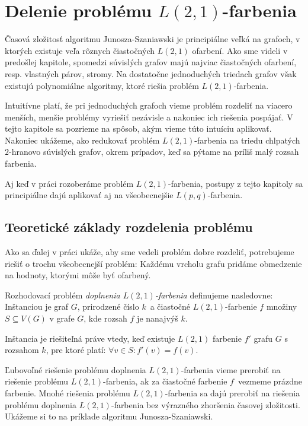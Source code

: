 \chapter{Delenie problému $L(2,1)$-farbenia}

Časová zložitosť algoritmu Junosza-Szaniawski je principiálne veľká na grafoch, v ktorých
existuje veľa rôznych čiastočných $L(2,1)$ ofarbení. Ako sme videli v predošlej kapitole,
spomedzi súvislých grafov majú najviac čiastočných ofarbení, resp. vlastných párov, stromy.
Na dostatočne jednoduchých triedach grafov však existujú polynomiálne algoritmy, ktoré
riešia problém $L(2,1)$-farbenia.

Intuitívne platí, že pri jednoduchých grafoch vieme problém rozdeliť na viacero menších,
menšie problémy vyriešiť nezávisle a nakoniec ich riešenia pospájať. V tejto kapitole
sa pozrieme na spôsob, akým vieme túto intuíciu aplikovať. Nakoniec ukážeme, ako redukovať
problém $L(2,1)$-farbenia na triedu chlpatých $2$-hranovo súvislých grafov, okrem prípadov,
keď sa pýtame na príliš malý rozsah farbenia.

Aj keď v práci rozoberáme problém $L(2,1)$-farbenia, postupy z tejto kapitoly sa principiálne
dajú aplikovať aj na všeobecnejšie $L(p,q)$-farbenia.

\section{Teoretické základy rozdelenia problému}

Ako sa ďalej v práci ukáže, aby sme vedeli problém dobre rozdeliť, potrebujeme riešiť
o trochu všeobecnejší problém: Každému vrcholu grafu pridáme obmedzenie na hodnoty,
ktorými môže byť ofarbený.

\begin{defn}
    Rozhodovací problém \emph{doplnenia $L(2,1)$-farbenia} definujeme nasledovne: Inštanciou je
    graf $G$, prirodzené číslo $k$ a čiastočné $L(2,1)$-farbenie $f$ množiny $S \subseteq V(G)$
    v grafe $G$, kde rozsah $f$ je nanajvýš $k$.

    Inštancia je riešiteľná práve vtedy, keď existuje $L(2,1)$ farbenie
    $f'$ grafu $G$ s rozsahom $k$, pre ktoré platí: $\forall v \in S: f'(v) = f(v)$.
\end{defn}

Ľubovoľné riešenie problému doplnenia $L(2,1)$-farbenia vieme prerobiť na riešenie
problému $L(2,1)$-farbenia, ak za čiastočné farbenie $f$ vezmeme prázdne farbenie.
Mnohé riešenia problému $L(2,1)$-farbenia sa dajú prerobiť na riešenia problému
doplnenia $L(2,1)$-farbenia bez výrazného zhoršenia časovej zložitosti.
Ukážeme si to na príklade algoritmu Junosza-Szaniawski.

